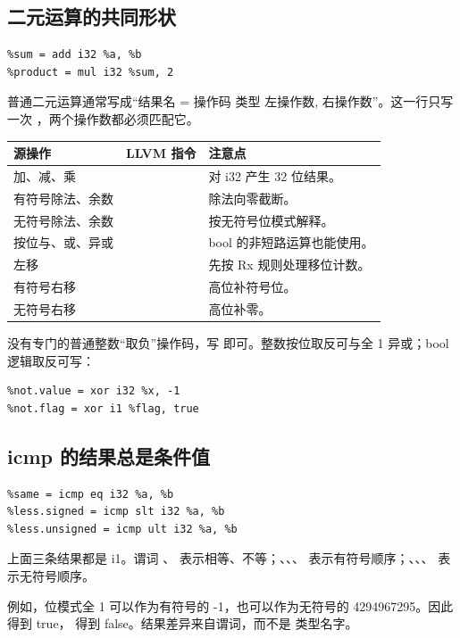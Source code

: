 \subsection{二元运算的共同形状}
\begin{lstlisting}
%sum = add i32 %a, %b
%product = mul i32 %sum, 2
\end{lstlisting}
普通二元运算通常写成“结果名 = 操作码 类型 左操作数, 右操作数”。这一行只写一次 ，两个操作数都必须匹配它。

\begin{tabularx}{\linewidth}{@{}p{30mm}p{45mm}Y@{}}
\toprule
源操作 & LLVM 指令 & 注意点 \\
\midrule
加、减、乘 &  & 对 i32 产生 32 位结果。\\
有符号除法、余数 &  & 除法向零截断。\\
无符号除法、余数 &  & 按无符号位模式解释。\\
按位与、或、异或 &  & bool 的非短路运算也能使用。\\
左移 &  & 先按 Rx 规则处理移位计数。\\
有符号右移 &  & 高位补符号位。\\
无符号右移 &  & 高位补零。\\
\bottomrule
\end{tabularx}

没有专门的普通整数“取负”操作码，写  即可。整数按位取反可与全 1 异或；bool 逻辑取反可写：
\begin{lstlisting}
%not.value = xor i32 %x, -1
%not.flag = xor i1 %flag, true
\end{lstlisting}

\subsection{icmp 的结果总是条件值}
\begin{lstlisting}
%same = icmp eq i32 %a, %b
%less.signed = icmp slt i32 %a, %b
%less.unsigned = icmp ult i32 %a, %b
\end{lstlisting}
上面三条结果都是 i1。谓词 、 表示相等、不等；、、、 表示有符号顺序；、、、 表示无符号顺序。

例如，位模式全 1 可以作为有符号的 -1，也可以作为无符号的 4294967295。因此  得到 true， 得到 false。结果差异来自谓词，而不是  类型名字。

